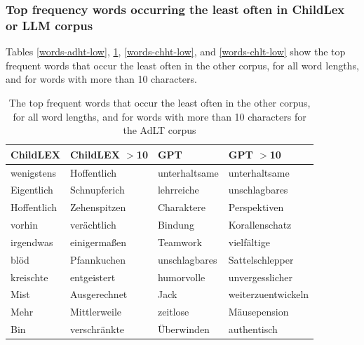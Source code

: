 \documentclass[doc, a4paper]{apa7}
\begin{document}
\clearpage

\subsubsection{Top frequency words occurring the least often in ChildLex or LLM corpus}

Tables \ref{words-adht-low}, \ref{words-adlt-low}, \ref{words-chht-low}, and \ref{words-chlt-low} show the top frequent words that occur the least often in the other corpus, for all word lengths, and for words with more than 10 characters.


\begin{table}[!htbp]
\caption{The top frequent words that occur the least often in the other corpus, for all word lengths, and for words with more than 10 characters for the AdLT corpus}
\centering
\begin{tabular}{llll}
  \hline
ChildLEX & ChildLEX $>$10 & GPT & GPT $>$10 \\ 
  \hline
wenigstens & Hoffentlich & unterhaltsame & unterhaltsame \\ 
  Eigentlich & Schnupferich & lehrreiche & unschlagbares \\ 
  Hoffentlich & Zehenspitzen & Charaktere & Perspektiven \\ 
  vorhin & verächtlich & Bindung & Korallenschatz \\ 
  irgendwas & einigermaßen & Teamwork & vielfältige \\ 
  blöd & Pfannkuchen & unschlagbares & Sattelschlepper \\ 
  kreischte & entgeistert & humorvolle & unvergesslicher \\ 
  Mist & Ausgerechnet & Jack & weiterzuentwickeln \\ 
  Mehr & Mittlerweile & zeitlose & Mäusepension \\ 
  Bin & verschränkte & Überwinden & authentisch \\ 
   \hline
\end{tabular}
\label{words-adlt-low}
\end{table}
\end{document}
